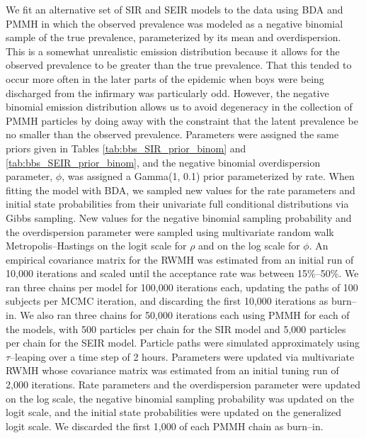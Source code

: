 We fit an alternative set of SIR and SEIR models to the data using BDA and PMMH in which the observed prevalence was modeled as a negative binomial sample of the true prevalence, parameterized by its mean and overdispersion. This is a somewhat unrealistic emission distribution because it allows for the observed prevalence to be greater than the true prevalence. That this tended to occur more often in the later parts of the epidemic when boys were being discharged from the infirmary was particularly odd. However, the negative binomial emission distribution allows us to avoid degeneracy in the collection of PMMH particles by doing away with the constraint that the latent prevalence be no smaller than the observed prevalence. Parameters were assigned the same priors given in Tables \ref{tab:bbs_SIR_prior_binom} and \ref{tab:bbs_SEIR_prior_binom}, and the negative binomial overdispersion parameter, $ \phi $, was assigned a Gamma(1, 0.1) prior parameterized by rate. When fitting the model with BDA, we sampled new values for the rate parameters and initial state probabilities from their univariate full conditional distributions via Gibbs sampling. New values for the negative binomial sampling probability and the overdispersion parameter were sampled using multivariate random walk Metropolis--Hastings on the logit scale for $ \rho $ and on the log scale for $ \phi $. An empirical covariance matrix for the RWMH was estimated from an initial run of 10,000 iterations and scaled until the acceptance rate was between 15\%--50\%. We ran three chains per model for 100,000 iterations each, updating the paths of 100 subjects per MCMC iteration, and discarding the first 10,000 iterations as burn--in. We also ran three chains for 50,000 iterations each using PMMH for each of the models, with 500 particles per chain for the SIR model and 5,000 particles per chain for the SEIR model. Particle paths were simulated approximately using $ \tau $--leaping over a time step of 2 hours. Parameters were updated via multivariate RWMH whose covariance matrix was estimated from an initial tuning run of 2,000 iterations. Rate parameters and the overdispersion parameter were updated on the log scale, the negative binomial sampling probability was updated on the logit scale, and the initial state probabilities were updated on the generalized logit scale. We discarded the first 1,000 of each PMMH chain as burn--in.

